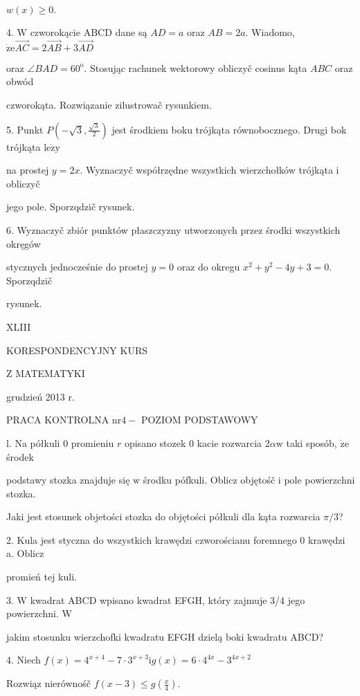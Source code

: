 \documentclass[a4paper,12pt]{article}
\begin{document}
$w(x)\geq 0.$

4. $\mathrm{W}$ czworokącie ABCD dane są $AD=a$ oraz $AB=2a$. Wiadomo, $\dot{\mathrm{z}}\mathrm{e}\vec{AC}=2\vec{AB}+3\vec{AD}$

oraz $\angle BAD=60^{\mathrm{o}}$. Stosując rachunek wektorowy obliczyč cosinus kąta $ABC$ oraz obwód

czworokąta. Rozwiązanie zilustrowač rysunkiem.

5. Punkt $P(-\displaystyle \sqrt{3},\frac{\sqrt{3}}{2})$ jest środkiem boku trójkąta równobocznego. Drugi bok trójkąta $\mathrm{l}\mathrm{e}\dot{\mathrm{z}}\mathrm{y}$

na prostej $y=2x$. Wyznaczyč współrzędne wszystkich wierzchołków trójkąta $\mathrm{i}$ obliczyč

jego pole. Sporzqdzič rysunek.

6. Wyznaczyč zbiór punktów płaszczyzny utworzonych przez środki wszystkich okręgów

stycznych jednocześnie do prostej $y=0$ oraz do okregu $x^{2}+y^{2}-4y+3=0$. Sporzqdzič

rysunek.





XLIII

KORESPONDENCYJNY KURS

Z MATEMATYKI

grudzień 2013 r.

PRACA KONTROLNA $\mathrm{n}\mathrm{r} 4-$ POZIOM PODSTAWOWY

l. Na półkuli $0$ promieniu $r$ opisano stozek $0$ kacie rozwarcia $2\alpha \mathrm{w}$ taki sposób, $\dot{\mathrm{z}}\mathrm{e}$ środek

podstawy stozka znajduje się $\mathrm{w}$ środku pófkuli. Oblicz objętośč $\mathrm{i}$ pole powierzchni stozka.

Jaki jest stosunek objetości stozka do objętości półkuli dla kąta rozwarcia $\pi/3$?

2. Kula jest styczna do wszystkich krawędzi czworościanu foremnego 0 krawędzi a. Oblicz

promień tej kuli.

3. $\mathrm{W}$ kwadrat ABCD wpisano kwadrat EFGH, który zajmuje 3/4 jego powierzchni. $\mathrm{W}$

jakim stosunku wierzchofki kwadratu EFGH dzielą boki kwadratu ABCD?

4. Niech $f(x)=4^{x+4}-7\cdot 3^{x+3}\mathrm{i}g(x)=6\cdot 4^{4x}-3^{4x+2}$

Rozwiąz nierównośč $f(x-3)\displaystyle \leq g(\frac{x}{4}).$
\end{document}

